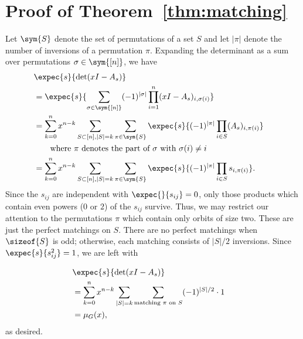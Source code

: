 \documentclass[11pt]{article}
\begin{document}







%



\appendix

\section{Proof of Theorem~\ref{thm:matching}}\label{sec:ggtheorem}


Let $\sym{S}$ denote the set of permutations of a set $S$ and let $|\pi|$ denote the number of inversions of a permutation $\pi$.
Expanding the determinant as a sum over permutations $\sigma \in \sym{[n]}$, we have
\begin{align*}
\lefteqn{\expec{s}{\det(xI-A_s)}} \\
&=\expec{s}{\sum_{\sigma \in \sym{[n]}} (-1)^{|\sigma|} \prod_{i=1}^n(xI-A_s)_{i, \sigma(i)}}
\\&=\sum_{k=0}^n x^{n-k}\sum_{S\subset [n],|S|=k}\sum_{\pi \in
\sym{S}}\expec{s}{(-1)^{|\pi|} \prod_{i\in S} (A_s)_{i, \pi(i)}}
\\&\qquad\textrm{where $\pi$ denotes the part of $\sigma$ with $\sigma(i)\neq i$}
\\&=\sum_{k=0}^n x^{n-k}\sum_{S\subset
[n],|S|=k}\sum_{\pi\in\sym{S}}\expec{s}{(-1)^{|\pi|} \prod_{i\in S} s_{i, \pi(i)}}.
\end{align*}
Since the $s_{ij}$ are independent with $\expec{}{s_{ij}}=0$, only those products which contain even powers ($0$ or $2$) 
of the $s_{ij}$ survive. Thus, we may restrict our attention to the permutations $\pi$ which contain only orbits of size two.
These are just the perfect matchings on $S$.
There are no perfect matchings when $\sizeof{S}$ is odd; 
otherwise, each matching consists of 
$|S|/2$ inversions.
Since $\expec{s}{s_{ij}^2} = 1$, we are left with

\begin{align*}
\lefteqn{\expec{s}{\det(xI-A_s)}} \\
& =\sum_{k=0}^n
x^{n-k}\sum_{|S|=k}\sum_{\textrm{matching $\pi$ on $S$}} (-1)^{|S|/2}\cdot 1 
\\
&= \mu_G(x),
\end{align*}
as desired.



\end{document}
